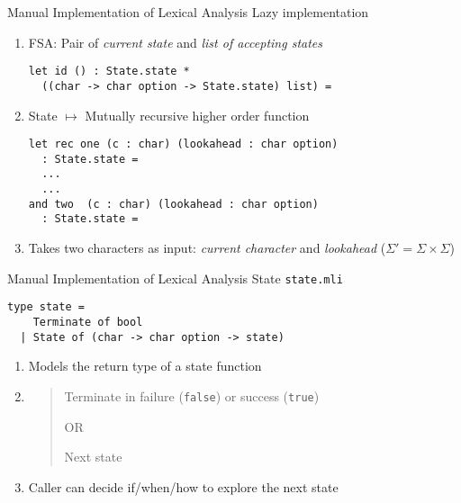 \documentclass{beamer}
\begin{document}


\begin{frame}[fragile]{Manual Implementation of Lexical Analysis}
{Lazy implementation}
\begin{enumerate}
	\item FSA: Pair of \emph{current state} and \emph{list of accepting states}
\begin{lstlisting}[style=camlcode]
let id () : State.state * 
  ((char -> char option -> State.state) list) =
\end{lstlisting}

	\item State $\mapsto$ Mutually recursive higher order function
\begin{lstlisting}[style=camlcode]
let rec one (c : char) (lookahead : char option) 
  : State.state =
  ...
  ...
and two  (c : char) (lookahead : char option)
  : State.state =
\end{lstlisting}
	\item Takes two characters as input: \emph{current character} and \emph{lookahead} ($\Sigma' = \Sigma \times \Sigma$)
\end{enumerate}
\end{frame}

\begin{frame}[fragile]{Manual Implementation of Lexical Analysis}
{State}
\texttt{\color{Brown}state.mli}
\begin{lstlisting}[style=camlcode]
type state =
    Terminate of bool
  | State of (char -> char option -> state)
\end{lstlisting}

\begin{enumerate}
	\item Models the return type of a state function
	\item \hspace{1cm}
	
	\begin{quotation}
	Terminate in failure (\lstinline[style=camlcode]|false|) or success (\lstinline[style=camlcode]|true|)
	
	OR
	
	Next state
	\end{quotation}
	\item Caller can decide if/when/how to explore the next state
\end{enumerate}
\end{frame}
\end{document}
